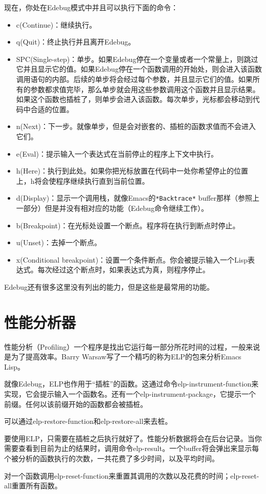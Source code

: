 现在，你处在Edebug模式中并且可以执行下面的命令：

\begin{itemize}
  \item c(Continue)：继续执行。
  \item q(Quit)：终止执行并且离开Edebug。
  \item SPC(Single-step)：单步。如果Edebug停在一个变量或者一个常量上，则跳过它并且显示它的值。如果Edebug停在一个函数调用的开始处，则会进入该函数调用语句的内部。后续的单步将会经过每个参数，并且显示它们的值。如果所有的参数都求值完毕，那么单步就会用这些参数调用这个函数并且显示结果。如果这个函数也插桩了，则单步会进入该函数。每次单步，光标都会移动到代码中合适的位置。
  \item n(Next)：下一步。就像单步，但是会对嵌套的、插桩的函数求值而不会进入它们。
  \item e(Eval)：提示输入一个表达式在当前停止的程序上下文中执行。
  \item h(Here)：执行到此处。如果你把光标放置在代码中一处你希望停止的位置上，h将会使程序继续执行直到当前位置。
  \item d(Display)：显示一个调用栈，就像Emacs的\texttt{*Backtrace*} buffer那样（参照上一部分）但是并没有相对应的功能（Edebug命令继续工作）。
  \item b(Breakpoint)：在光标处设置一个断点。程序将在执行到断点时停止。
  \item u(Unset)：去掉一个断点。
  \item x(Conditional breakpoint)：设置一个条件断点。你会被提示输入一个Lisp表达式。每次经过这个断点时，如果表达式为真，则程序停止。
\end{itemize}

Edebug还有很多这里没有列出的能力，但是这些是最常用的功能。

\section{性能分析器}
\label{section:C-The-Profiler}

性能分析（Profiling）一个程序是找出它运行每一部分所花时间的过程，一般来说是为了提高效率。Barry Warsaw写了一个精巧的称为ELP的包来分析Emacs Lisp。

就像Edebug，ELP也作用于“插桩”的函数。这通过命令elp-instrument-function来实现，它会提示输入一个函数名。还有一个elp-instrument-package，它提示一个前缀。任何以该前缀开始的函数都会被插桩。

可以通过elp-restore-function和elp-restore-all来去桩。

要使用ELP，只需要在插桩之后执行就好了。性能分析数据将会在后台记录。当你需要查看到目前为止的结果时，调用命令elp-result。一个buffer将会弹出来显示每个被分析的函数执行的次数，一共花费了多少时间，以及平均时间。

对一个函数调用elp-reset-function来重置其调用的次数以及花费的时间；elp-reset-all重置所有函数。
